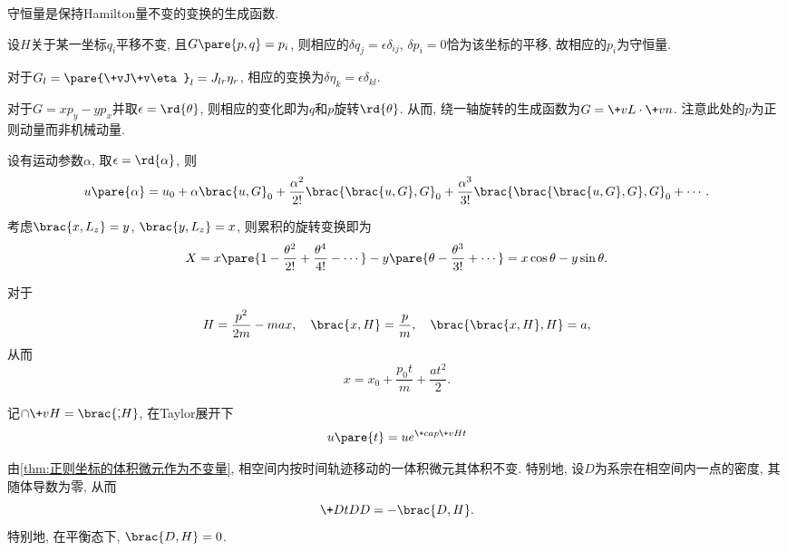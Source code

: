 \documentclass[../TheoreticalMechanics.tex]{subfiles}
\begin{document}
\begin{finale}
    \begin{theorem}[守恒量条件]
        守恒量是保持Hamilton量不变的变换的生成函数.
    \end{theorem}
\end{finale}
\begin{ex}
    设$H$关于某一坐标$q_i$平移不变, 且$G\pare{p,q}=p_i$, 则相应的$\delta q_j = \epsilon \delta_{ij}$, $\delta p_i = 0$恰为该坐标的平移, 故相应的$p_i$为守恒量.
\end{ex}
\begin{remark}
    对于$G_l = \pare{\+vJ\+v\eta}_l = J_{lr}\eta_r$, 相应的变换为$\delta \eta_k = \epsilon \delta_{kl}$.
\end{remark}
\begin{ex}
    对于$G = xp_y - yp_x$并取$\epsilon = \rd{\theta}$, 则相应的变化即为$q$和$p$旋转$\rd{\theta}$. 从而, 绕一轴旋转的生成函数为$G = \+vL\cdot\+vn$. 注意此处的$p$为正则动量而非机械动量.
\end{ex}
\begin{lemma}[无穷小变换的积分]
    设有运动参数$\alpha$, 取$\epsilon = \rd{\alpha}$, 则
    \[ u\pare{\alpha} = u_0 + \alpha\brac{u,G}_0 + \frac{\alpha^2}{2!}\brac{\brac{u,G},G}_0 + \frac{\alpha^3}{3!}\brac{\brac{\brac{u,G},G},G}_0 + \cdots. \]
\end{lemma}
\begin{ex}
    考虑$\brac{x,L_z} = y$, $\brac{y,L_z} = x$, 则累积的旋转变换即为
    \[ X = x\pare{1 - \frac{\theta^2}{2!} + \frac{\theta^4}{4!} - \cdots} - y\pare{\theta - \frac{\theta^3}{3!} + \cdots} = x\cos\theta - y\sin\theta. \]
\end{ex}
\begin{ex}
    对于
    \[ H = \frac{p^2}{2m} - max,\quad \brac{x,H} = \frac{p}{m},\quad \brac{\brac{x,H},H} = a, \]
    从而
    \[ x = x_0 + \frac{p_0t}{m} + \frac{at^2}{2}. \]
\end{ex}
\begin{finale}
    \begin{theorem}[经典力学的Heisenberg绘景]
        记$\cap{\+vH} = \brac{\dot, H}$, 在Taylor展开下
        \[ u\pare{t} = ue^{\+cap{\+vH}t} \]
    \end{theorem}
\end{finale}
\begin{theorem}[Liouville定理]
    由\cref{thm:正则坐标的体积微元作为不变量}, 相空间内按时间轨迹移动的一体积微元其体积不变. 特别地, 设$D$为系宗在相空间内一点的密度, 其随体导数为零, 从而
    \[ \+DtDD = -\brac{D,H}. \]
    特别地, 在平衡态下, $\brac{D,H} = 0$.
\end{theorem}
\end{document}
